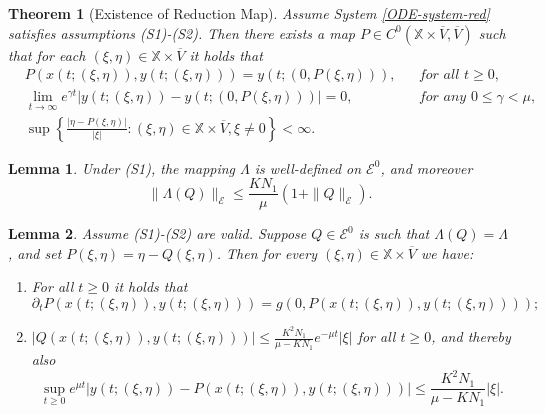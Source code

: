 \documentclass[10pt,a4paper]{amsart}
\newtheorem{theorem}{Theorem}
\newtheorem{lemma}{Lemma}
\newcommand{\XSet}{\mathbb{X}}
\begin{document}
 \begin{theorem}[Existence of Reduction Map]\label{thm:red-map-existence}
Assume System \cref{ODE-system-red} satisfies assumptions (S1)-(S2). Then there
exists a map $P \in C^0(\XSet \times \overline{V}, \overline{V})$ such that for each
$(\xi,\eta) \in \XSet \times \overline{V}$ it holds that 
\[
  \begin{aligned}
    & P(x(t; (\xi,\eta)),y(t;(\xi,\eta))) = y(t; (0,P(\xi,\eta))),  
      && \textit{for all $t \geq 0$,} \\
    & \lim_{t \rightarrow \infty} e^{\gamma t}  | y(t;(\xi,\eta)) - y(t; (0,P(\xi,\eta))) | = 0,
      && \textit{for any $0 \leq \gamma < \mu $,} \\
    & \sup \left\{ \frac{|\eta - P(\xi,\eta)|}{|\xi|} 
      \colon (\xi,\eta) \in \XSet \times \overline{V}, \xi \neq 0   \right\} < \infty.
  \end{aligned}
\]
 \end{theorem}

\begin{lemma}\label{lem:red-map-well-defined}
Under (S1), the mapping $\Lambda$ is well-defined on $\mathcal{E}^0$, and moreover
\[
  \| \Lambda(Q) \|_{\mathcal{E}} \leq \frac{K N_1}{\mu} (1+  \| Q \|_{\mathcal{E}}).
\]
\end{lemma}

\begin{lemma}\label{lem:red-map-props}
Assume (S1)-(S2) are valid. Suppose $Q \in  \mathcal{E}^0$ is such that $\Lambda(Q)=\Lambda$, and set $P(\xi,\eta) = \eta - Q(\xi,\eta)$. Then for every $(\xi,\eta) \in \XSet \times \overline{V}$ we have:
\begin{enumerate}
 \item For all $t \geq 0$ it holds that 
 \[
 \partial_t P(x(t; (\xi,\eta)),y(t;(\xi,\eta))) = g(0, P(x(t; (\xi,\eta)),y(t;(\xi,\eta))));
 \]
 \item $| Q(x(t; (\xi,\eta)),y(t;(\xi,\eta))) | \leq \frac{K^2 N_1}{\mu - K N_1} e^{-\mu t}  |\xi|$ for all $t \geq 0$, and thereby also
 \[
 \sup_{t \geq 0} e^{\mu t} | y(t;(\xi,\eta)) -  P(x(t; (\xi,\eta)),y(t;(\xi,\eta))) | \leq  \frac{K^2 N_1}{\mu - K N_1} |\xi|.
 \]
\end{enumerate}
\end{lemma}
\end{document}
